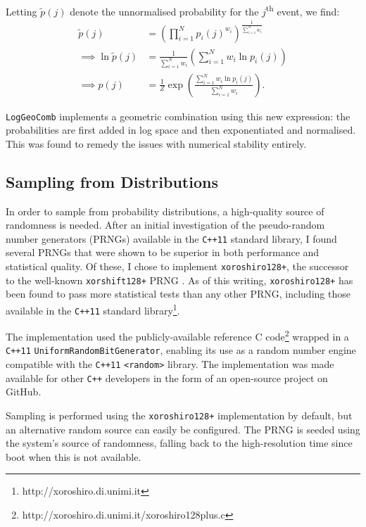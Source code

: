 \documentclass[12pt,a4paper,twoside,openright]{report}
\begin{document}
Letting $\widetilde{p}(j)$ denote the unnormalised probability for the
$j$\textsuperscript{th} event, we find:
\begin{align*}
  \widetilde{p}(j) &= \left( \prod_{i=1}^N p_i(j)^{w_i}
  \right)^{\frac{1}{\sum_{i=1}^N w_i}} \\[3mm]
  \implies \ln{\widetilde{p}(j)} &= \frac{1}{\sum_{i = 1}^N w_i} \left( \sum_{i
  = 1}^N w_i \ln{p_i(j)} \right) \\[3mm]
  \implies p(j) &= \frac{1}{Z} \exp \left( \frac{\sum_{i = 1}^N w_i \ln{ p_i(j)
  }}{ \sum_{i = 1}^N w_i } \right).
\end{align*}

\texttt{LogGeoComb} implements a geometric combination using this new
expression: the probabilities are first added in log space and then
exponentiated and normalised. This was found to remedy the issues with numerical
stability entirely.

\subsection{Sampling from Distributions}

In order to sample from probability distributions, a high-quality source of
randomness is needed. After an initial investigation of the pseudo-random number
generators (PRNGs) available in the \texttt{C++11} standard library, I found
several PRNGs that were shown to be superior in both performance and statistical
quality. Of these, I chose to implement \texttt{xoroshiro128+}, the successor to
the well-known \texttt{xorshift128+} PRNG \cite{vigna2017further}. As of this
writing, \texttt{xoroshiro128+} has been found to pass more statistical tests
than any other PRNG, including those available in the \texttt{C++11} standard
library\footnote{http://xoroshiro.di.unimi.it}. 

The implementation used the publicly-available reference C
code\footnote{http://xoroshiro.di.unimi.it/xoroshiro128plus.c} wrapped in a
\texttt{C++11} \texttt{UniformRandomBitGenerator}, enabling its use as a random
number engine compatible with the \texttt{C++11} \texttt{<random>} library. The
implementation was made available for other \texttt{C++} developers in the form
of an open-source project on GitHub.

Sampling is performed using the \texttt{xoroshiro128+} implementation by
default, but an alternative random source can easily be configured. The PRNG is
seeded using the system's source of randomness, falling back to the
high-resolution time since boot when this is not available.
\end{document}
